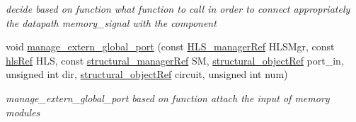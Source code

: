 \begin{DoxyCompactItemize}
\begin{DoxyCompactList}\small\item\em decide based on function what function to call in order to connect appropriately the datapath memory\+\_\+signal with the component \end{DoxyCompactList}\item 
void \hyperlink{classfu__binding__cs_a2c94fa860b8c7ca4d4bac3c107faa957}{manage\+\_\+extern\+\_\+global\+\_\+port} (const \hyperlink{hls__manager_8hpp_acd3842b8589fe52c08fc0b2fcc813bfe}{H\+L\+S\+\_\+manager\+Ref} H\+L\+S\+Mgr, const \hyperlink{hls_8hpp_a75d0c73923d0ddfa28c4843a802c73a7}{hls\+Ref} H\+LS, const \hyperlink{structural__manager_8hpp_ab3136f0e785d8535f8d252a7b53db5b5}{structural\+\_\+manager\+Ref} SM, \hyperlink{structural__objects_8hpp_a8ea5f8cc50ab8f4c31e2751074ff60b2}{structural\+\_\+object\+Ref} port\+\_\+in, unsigned int dir, \hyperlink{structural__objects_8hpp_a8ea5f8cc50ab8f4c31e2751074ff60b2}{structural\+\_\+object\+Ref} circuit, unsigned int num)
\begin{DoxyCompactList}\small\item\em manage\+\_\+extern\+\_\+global\+\_\+port based on function attach the input of memory modules \end{DoxyCompactList}\end{DoxyCompactItemize}
